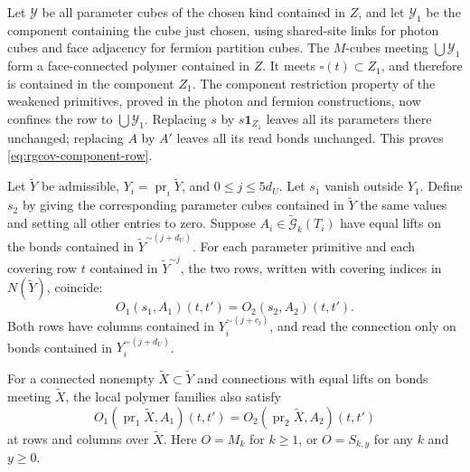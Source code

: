 Let $\mathscr Y$ be all parameter cubes of the chosen kind
contained in $Z$, and let $\mathscr Y_1$ be the component
containing the cube just chosen, using shared-site links for
photon cubes and face adjacency for fermion partition cubes.
The $M$-cubes meeting
$\bigcup\mathscr Y_1$ form a face-connected polymer
contained in $Z$. It meets $\square(t)\subset Z_1$,
and therefore is contained in the component $Z_1$.
The component restriction property of the weakened
primitives, proved in the photon and fermion constructions,
now confines the row to $\bigcup\mathscr Y_1$.
Replacing $s$ by $s\mathbf1_{Z_1}$ leaves all its
parameters there unchanged; replacing $A$ by $A'$
leaves all its read bonds unchanged. This proves
\eqref{eq:rgcov-component-row}.

\begin{proposition}\label{prop:rgcov-supported-rows}
Let $\widetilde Y$ be admissible, $Y_i=\operatorname{pr}_i
\widetilde Y$, and $0\le j\le5d_U$. Let $s_1$ vanish
outside $Y_1$. Define $s_2$ by giving the corresponding
parameter cubes contained in $\widetilde Y$ the same
values and setting all other entries to zero.
Suppose $A_i\in\widetilde{\mathcal G}_k(T_i)$ have equal
lifts on the bonds contained in
$\widetilde Y^{\sim(j+d_U)}$.
For each parameter primitive and each covering row $t$
contained in $\widetilde Y^{\sim j}$, the two rows,
written with covering indices in $N(\widetilde Y)$,
coincide:
\begin{equation}\label{eq:rgcov-local-primitive-row}
                 O_1(s_1,A_1)(t,t')=O_2(s_2,A_2)(t,t').
\end{equation}
Both rows have columns contained in
$Y_i^{\sim(j+c_l)}$, and read the connection only on
bonds contained in $Y_i^{\sim(j+d_U)}$.

For a connected nonempty $\widetilde X\subset\widetilde Y$
and connections with equal lifts on bonds meeting
$\widetilde X$, the local polymer families also satisfy
\begin{equation}\label{eq:rgcov-local-polymer-kernel}
 O_1(\operatorname{pr}_1\widetilde X,A_1)(t,t')
       =O_2(\operatorname{pr}_2\widetilde X,A_2)(t,t')
\end{equation}
at rows and columns over $\widetilde X$.
Here $O=M_k$ for $k\ge1$, or $O=S_{k,y}$ for any $k$
and $y\ge0$.
\end{proposition}

